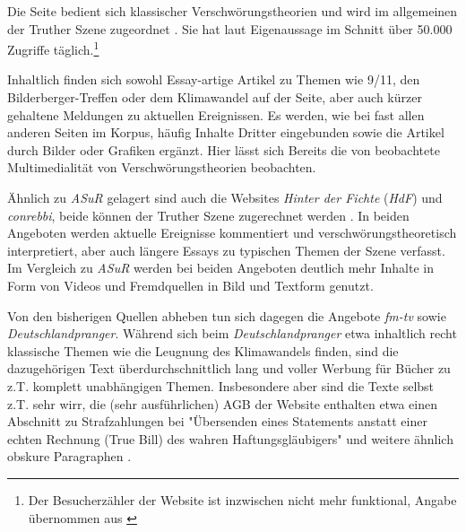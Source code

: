Die Seite bedient sich klassischer Verschwörungstheorien und wird im allgemeinen der Truther Szene zugeordnet \parencite{psiram-asur}.
Sie hat laut Eigenaussage im Schnitt über 50.000 Zugriffe täglich.\footnote{Der Besucherzähler der Website ist inzwischen nicht mehr funktional, Angabe übernommen aus \textcite{vice-asur}}

Inhaltlich finden sich sowohl Essay-artige Artikel zu Themen wie 9/11, den Bilderberger-Treffen oder dem Klimawandel auf der Seite, aber auch kürzer gehaltene Meldungen zu aktuellen Ereignissen.
Es werden, wie bei fast allen anderen Seiten im Korpus, häufig Inhalte Dritter eingebunden sowie die Artikel durch Bilder oder Grafiken ergänzt.
Hier lässt sich Bereits die von \textcite{soukup_2008} beobachtete Multimedialität von Verschwörungstheorien beobachten.

Ähnlich zu \textit{ASuR} gelagert sind auch die Websites \textit{Hinter der Fichte} (\textit{HdF}) und \textit{conrebbi}, beide können der Truther Szene zugerechnet werden \cite[siehe etwa][]{psiram-conrebbi}.
In beiden Angeboten werden aktuelle Ereignisse kommentiert und verschwörungstheoretisch interpretiert, aber auch längere Essays zu typischen Themen der Szene verfasst.
Im Vergleich zu \textit{ASuR} werden bei beiden Angeboten deutlich mehr Inhalte in Form von Videos und Fremdquellen in Bild und Textform genutzt.

Von den bisherigen Quellen abheben tun sich dagegen die Angebote \textit{fm-tv} sowie \textit{Deutschlandpranger}.
Während sich beim \textit{Deutschlandpranger} etwa inhaltlich recht klassische Themen wie die Leugnung des Klimawandels \parencite*[vgl.][]{dprang-klima} finden, sind die dazugehörigen Text überdurchschnittlich lang und voller Werbung für Bücher zu z.T. komplett unabhängigen Themen.
Insbesondere aber sind die Texte selbst z.T. sehr wirr, die (sehr ausführlichen) AGB der Website enthalten etwa einen Abschnitt zu Strafzahlungen bei "Übersenden eines Statements anstatt einer echten Rechnung (True Bill) des wahren Haftungsgläubigers" \parencite*{dprang-agb} und weitere ähnlich obskure Paragraphen .

